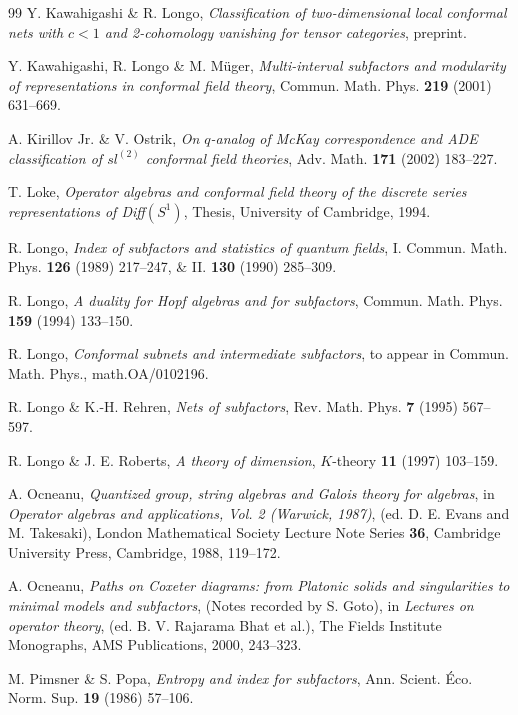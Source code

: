\documentclass[12pt]{article}
\begin{document}
{\begin{thebibliography}{99}
Y. Kawahigashi \& R. Longo,
{\it Classification of two-dimensional local conformal nets with $c<1$
and 2-cohomology vanishing for tensor categories}, preprint.

Y. Kawahigashi, R. Longo \& M. M\"uger, 
{\it Multi-interval subfactors and modularity of representations
in conformal field theory}, Commun. Math. Phys.
{\bf 219} (2001) 631--669.

A. Kirillov Jr. \& V. Ostrik,
{\it On $q$-analog of McKay correspondence and ADE classification of
$sl^{(2)}$ conformal field theories},
Adv. Math. {\bf 171} (2002) 183--227.

T. Loke,
{\it Operator algebras and conformal field theory of the
discrete series representations of {\rm Diff}$(S^1)$},
Thesis, University of Cambridge, 1994.

 R. Longo,
{\it Index of subfactors and statistics of quantum fields}, I.
Commun.  Math.  Phys.  {\bf 126} (1989) 217--247, \&
II. {\bf 130} (1990) 285--309.

R. Longo, {\it A duality for Hopf algebras and for subfactors},
Commun. Math. Phys. {\bf 159} (1994) 133--150.

R. Longo,
{\it Conformal subnets and intermediate subfactors}, 
to appear in Commun. Math. Phys., math.OA/0102196.

R. Longo \& K.-H. Rehren, {\it Nets of subfactors}, Rev. Math. Phys.
{\bf 7} (1995) 567--597.

R. Longo \& J. E. Roberts, {\it A theory of dimension}, $K$-theory
{\bf 11} (1997) 103--159.

A. Ocneanu,
{\it Quantized group, string algebras and Galois theory for algebras},
in {\em Operator algebras and applications, Vol. 2 (Warwick, 1987)},
(ed. D. E.  Evans and M. Takesaki), London Mathematical Society
Lecture Note Series {\bf 36}, 
Cambridge University Press, Cambridge, 1988, 119--172.

A. Ocneanu,
{\it Paths on Coxeter diagrams:
from Platonic solids and singularities to minimal models and subfactors},
(Notes recorded by S. Goto), in {\em Lectures on operator theory},
(ed. B. V. Rajarama Bhat et al.),
The Fields Institute Monographs, AMS Publications, 2000, 243--323.

M. Pimsner \& S. Popa, {\it Entropy and index for subfactors},
Ann. Scient. \'{E}co. Norm. Sup. {\bf 19} (1986) 57--106.


\end{thebibliography}}
\end{document}
